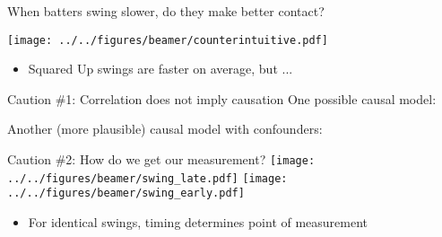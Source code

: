 \documentclass{beamer}
\begin{document}
\begin{frame}{When batters swing slower, do they make better contact?}
  \begin{center}
    \texttt{[image: ../../figures/beamer/counterintuitive.pdf]}
  \end{center}
  \begin{itemize}
    \item Squared Up swings are faster on average, but ...
  \end{itemize}
\end{frame}

\begin{frame}{Caution \#1: Correlation does not imply causation}
  One possible causal model:
  \begin{center}
  \end{center}
  Another (more plausible) causal model with confounders:
  \begin{center}
  \end{center}
\end{frame}

\begin{frame}{Caution \#2: How do we get our measurement?}
  \texttt{[image: ../../figures/beamer/swing\_late.pdf]}
  \texttt{[image: ../../figures/beamer/swing\_early.pdf]}
  \begin{itemize}
    \item For \alert{identical} swings, timing determines point of measurement
  \end{itemize}
\end{frame}
\end{document}
